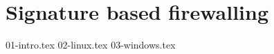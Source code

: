 \chapter{Signature based firewalling}
\label{sign:chapter}

{01-intro.tex}
{02-linux.tex}
{03-windows.tex}


